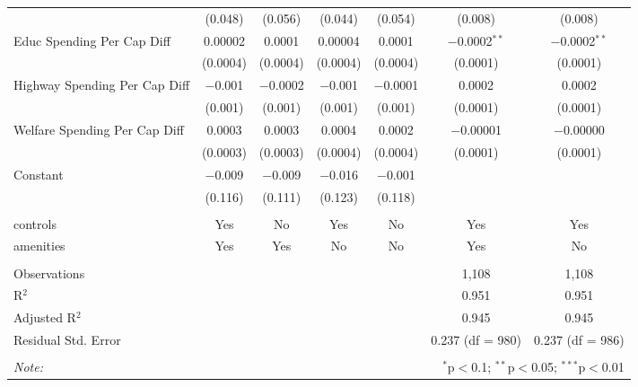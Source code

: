 \begin{table}[!htbp]
\begin{tabular}{@{\extracolsep{5pt}}lcccccc}
  & (0.048) & (0.056) & (0.044) & (0.054) & (0.008) & (0.008) \\ 
  Educ Spending Per Cap Diff & 0.00002 & 0.0001 & 0.00004 & 0.0001 & $-$0.0002$^{**}$ & $-$0.0002$^{**}$ \\ 
  & (0.0004) & (0.0004) & (0.0004) & (0.0004) & (0.0001) & (0.0001) \\ 
  Highway Spending Per Cap Diff & $-$0.001 & $-$0.0002 & $-$0.001 & $-$0.0001 & 0.0002 & 0.0002 \\ 
  & (0.001) & (0.001) & (0.001) & (0.001) & (0.0001) & (0.0001) \\ 
  Welfare Spending Per Cap Diff & 0.0003 & 0.0003 & 0.0004 & 0.0002 & $-$0.00001 & $-$0.00000 \\ 
  & (0.0003) & (0.0003) & (0.0004) & (0.0004) & (0.0001) & (0.0001) \\ 
  Constant & $-$0.009 & $-$0.009 & $-$0.016 & $-$0.001 &  &  \\ 
  & (0.116) & (0.111) & (0.123) & (0.118) &  &  \\ 
 \hline \\[-1.8ex] 
controls & Yes & No & Yes & No & Yes & Yes \\ 
amenities & Yes & Yes & No & No & Yes & No \\ 
\hline \\[-1.8ex] 
Observations &  &  &  &  & 1,108 & 1,108 \\ 
R$^{2}$ &  &  &  &  & 0.951 & 0.951 \\ 
Adjusted R$^{2}$ &  &  &  &  & 0.945 & 0.945 \\ 
Residual Std. Error &  &  &  &  & 0.237 (df = 980) & 0.237 (df = 986) \\ 
\hline 
\hline \\[-1.8ex] 
\textit{Note:}  & \multicolumn{6}{r}{$^{*}$p$<$0.1; $^{**}$p$<$0.05; $^{***}$p$<$0.01} \\ 
\end{tabular} 
\end{table} 
